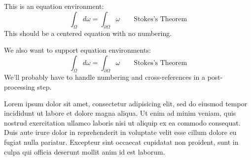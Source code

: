 This is an equation environment:
\[
\int_\Omega d\omega = \int_{\partial\Omega} \omega \qquad\mbox{Stokes's Theorem}
\]
This should be a centered equation with no numbering.

We also want to support equation environments:
\begin{equation}
\int_\Omega d\omega = \int_{\partial\Omega} \omega \qquad\mbox{Stokes's Theorem}
\end{equation}
We'll probably have to handle numbering and cross-references in a post-processing step.

Lorem ipsum dolor sit amet, consectetur adipisicing elit, sed do eiusmod
tempor incididunt ut labore et dolore magna aliqua. Ut enim ad minim veniam,
quis nostrud exercitation ullamco laboris nisi ut aliquip ex ea commodo
consequat. Duis aute irure dolor in reprehenderit in voluptate velit esse
cillum dolore eu fugiat nulla pariatur. Excepteur sint occaecat cupidatat non
proident, sunt in culpa qui officia deserunt mollit anim id est laborum.